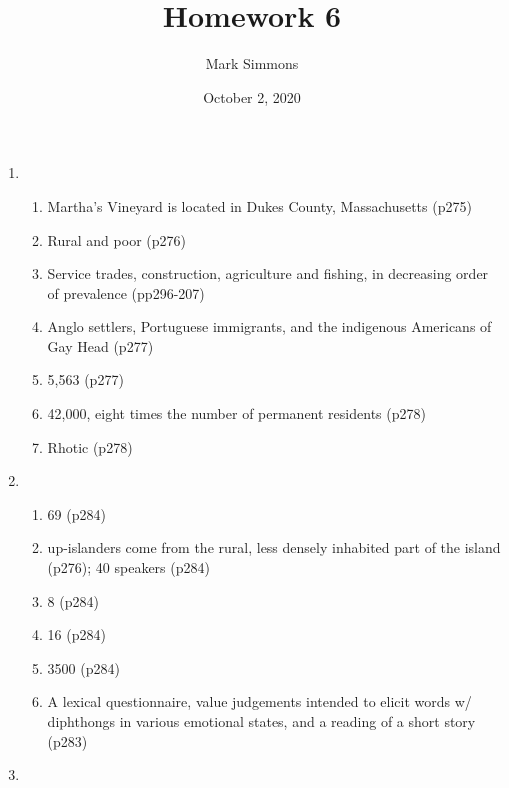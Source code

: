 \documentclass[12pt]{article}
\title{Homework 6}
\author{Mark Simmons}
\date{October 2, 2020}
\begin{document}
\maketitle

\begin{enumerate}
    \item
          \begin{enumerate}
              \item Martha's Vineyard is located in Dukes County, Massachusetts (p275)
              \item Rural and poor (p276)
              \item Service trades, construction, agriculture and fishing, in decreasing order of prevalence (pp296-207)
              \item Anglo settlers, Portuguese immigrants, and the indigenous Americans of Gay Head (p277)
              \item 5,563 (p277)
              \item 42,000, eight times the number of permanent residents (p278)
              \item Rhotic (p278)
          \end{enumerate}
    \item
          \begin{enumerate}
              \item 69 (p284)
              \item up-islanders come from the rural, less densely inhabited part of the island (p276); 40 speakers (p284)
              \item 8 (p284)
              \item 16 (p284)
              \item 3500 (p284)
              \item A lexical questionnaire, value judgements intended to elicit words w/ diphthongs in various emotional states,
                    and a reading of a short story (p283)
          \end{enumerate}
    \item


\end{enumerate}
\end{document}
